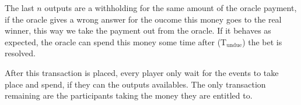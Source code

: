 The last $n$ outputs are a withholding for the same amount of the oracle
  payment, if the oracle gives a wrong answer for the oucome this money
  goes to the real winner, this way we take the payment out from the oracle.
If it behaves as expected, the oracle can spend this money some time after
  (T$_{\text{undue}}$) the bet is resolved.

After this transaction is placed, every player only wait for the events to take
  place and spend, if they can the outputs availables. The only transaction
  remaining are the participants taking the money they are entitled to.
